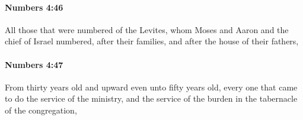 		\paragraph{Numbers 4:46} %
			\label{NUMBERS-4-46}

			All those that were numbered of the Levites, whom Moses and Aaron and the chief of Israel numbered, after their families, and after the house of their fathers,


		\paragraph{Numbers 4:47} %
			\label{NUMBERS-4-47}

			From thirty years old and upward even unto fifty years old, every one that came to do the service of the ministry, and the service of the burden in the tabernacle of the congregation,


